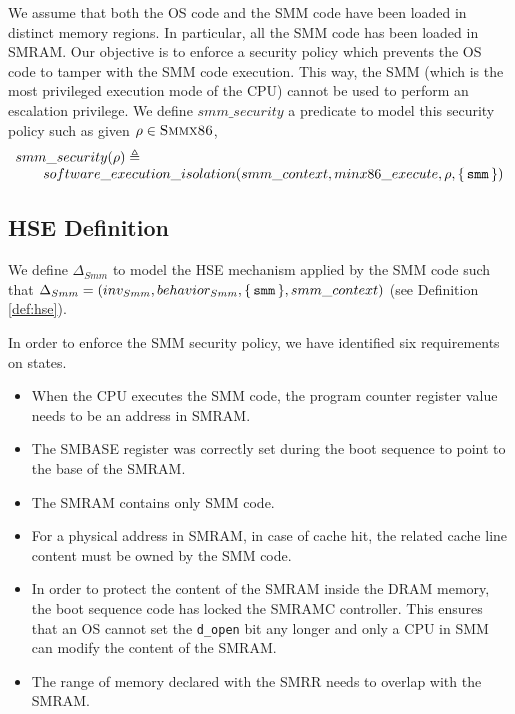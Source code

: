 We assume that both the OS code and the SMM code have been loaded in distinct
memory regions. In particular, all the SMM code has been loaded in SMRAM. Our
objective is to enforce a security policy which prevents the OS code to tamper
with the SMM code execution. This way, the SMM (which is the most privileged
execution mode of the CPU) cannot be used to perform an escalation privilege. We
define $smm\_security$ a predicate to model this security policy such as given
$\rho \in \textsc{Smmx86}$,
\[ \begin{array}{l} smm\_security(\rho) \triangleq \\ \qquad
    software\_execution\_isolation(smm\_context, minx86\_execute, \rho,
    \{\,\mathtt{smm}\,\}) \end{array} \]

\subsection{HSE Definition}

We define $\Delta_{Smm}$ to model the HSE mechanism applied by the SMM code such
that
$\Delta_{Smm} = (inv_{Smm}, behavior_{Smm}, \{\,\mathtt{smm}\,\},
smm\_context)$ (see Definition \ref{def:hse}).

In order to enforce the SMM security policy, we have identified six requirements
on states.
\begin{itemize}
\item When the CPU executes the SMM code, the program counter register value
  needs to be an address in SMRAM.
\item The SMBASE register was correctly set during the boot sequence to point to
  the base of the SMRAM.
\item The SMRAM contains only SMM code.
\item For a physical address in SMRAM, in case of cache hit, the related cache
  line content must be owned by the SMM code.
\item In order to protect the content of the SMRAM inside the DRAM memory, the
  boot sequence code has locked the SMRAMC controller. This ensures that an OS
  cannot set the \texttt{d\_open} bit any longer and only a CPU in SMM can
  modify the content of the SMRAM.
\item The range of memory declared with the SMRR needs to overlap with the
  SMRAM.
\end{itemize}


